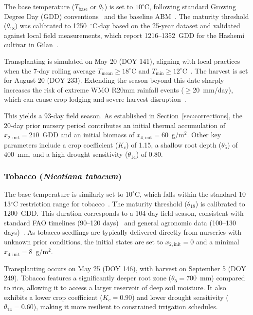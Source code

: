 The base temperature ($T_{\text{base}}$ or $\theta_7$) is set to $10^{\circ}$C, following standard Growing Degree Day (GDD) conventions~\cite{mcmaster1997, laohasiriwong2023} and the baseline ABM~\cite{Lopezjimenez2024}. The maturity threshold ($\theta_{18}$) was calibrated to 1250~$^{\circ}$C$\cdot$day based on the 25-year dataset and validated against local field measurements, which report 1216--1352~GDD for the Hashemi cultivar in Gilan~\cite{sadidi2021}. 

Transplanting is simulated on May 20 (DOY 141), aligning with local practices when the 7-day rolling average $T_{\text{mean}} \geq 18^{\circ}$C and $T_{\min} \geq 12^{\circ}$C~\cite{paredes2025, faghani2011}. The harvest is set for August 20 (DOY 233). Extending the season beyond this date sharply increases the risk of extreme WMO R20mm rainfall events ($\geq$20~mm/day), which can cause crop lodging and severe harvest disruption~\cite{sarma2018, nayak2011}. 

This yields a 93-day field season. As established in Section~\ref{sec:corrections}, the 20-day prior nursery period contributes an initial thermal accumulation of $x_{2,\text{init}} = 210$~GDD and an initial biomass of $x_{4,\text{init}} = 60$~g/m$^2$. Other key parameters include a crop coefficient ($K_c$) of 1.15, a shallow root depth ($\theta_5$) of 400~mm, and a high drought sensitivity ($\theta_{14}$) of 0.80.

\subsubsection{Tobacco (\emph{Nicotiana tabacum})}

The base temperature is similarly set to $10^{\circ}$C, which falls within the standard 10--13$^{\circ}$C restriction range for tobacco~\cite{li2021}. The maturity threshold ($\theta_{18}$) is calibrated to 1200~GDD. This duration corresponds to a 104-day field season, consistent with standard FAO timelines (90--120 days)~\cite{fao_tobacco} and general agronomic data (100--130 days)~\cite{britannica1999}. As tobacco seedlings are typically delivered directly from nurseries with unknown prior conditions, the initial states are set to $x_{2,\text{init}} = 0$ and a minimal $x_{4,\text{init}} = 8$~g/m$^2$.


Transplanting occurs on May 25 (DOY 146), with harvest on September 5 (DOY 249). Tobacco features a significantly deeper root zone ($\theta_5 = 700$~mm) compared to rice, allowing it to access a larger reservoir of deep soil moisture. It also exhibits a lower crop coefficient ($K_c = 0.90$) and lower drought sensitivity ($\theta_{14} = 0.60$), making it more resilient to constrained irrigation schedules. 

